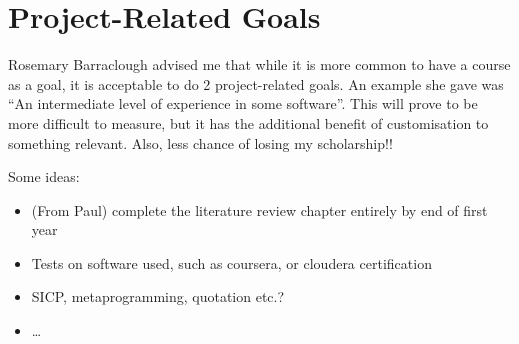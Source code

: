 \documentclass[10pt,a4paper]{article}
\begin{document}
\section{Project-Related Goals}
\label{sec:proj-relat-goals}

Rosemary Barraclough advised me that while it is more common to have a course as a goal, it is acceptable to do 2 project-related goals. An example she gave was ``An intermediate level of experience in some software''. This will prove to be more difficult to measure, but it has the additional benefit of customisation to something relevant. Also, less chance of losing my scholarship!!

Some ideas:
\begin{itemize}
\item (From Paul) complete the literature review chapter entirely by end of first year
\item Tests on software used, such as coursera, or cloudera certification
\item SICP, metaprogramming, quotation etc.?
\item \dots{}
\end{itemize}
\end{document}
